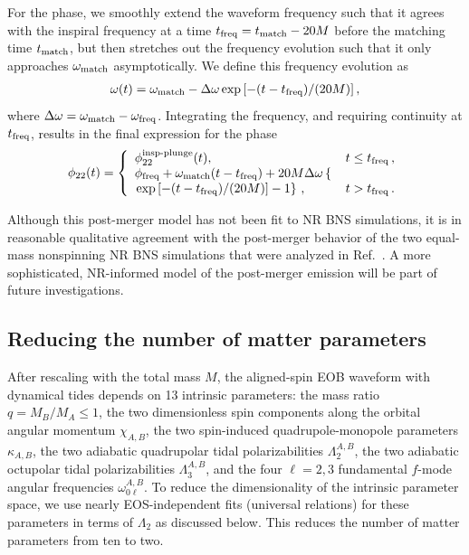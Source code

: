 \documentclass[prd,aps,letter,twocolumn,floatfix,notitlepage,nofootinbib]{revtex4-1}
\begin{document}
For the phase, we smoothly extend the waveform frequency such that it agrees with the inspiral frequency at a time $t_{\rm freq} = t_{\rm match} - 20M$ before the matching time $t_{\rm match}$, but then stretches out the frequency evolution such that it only approaches $\omega_{\rm match}$ asymptotically. We define this frequency evolution as
\begin{align}
\omega(t) = \omega_{\rm match} - \Delta\omega \exp\left[ -(t - t_{\rm freq}) / (20M) \right],
\end{align}
where $\Delta\omega = \omega_{\rm match} - \omega_{\rm freq}$. Integrating the frequency, and requiring continuity at $t_{\rm freq}$, results in the final expression for the phase
\begin{align}
\phi_{22}(t) = \left\{\begin{array}{ll}
\phi_{22}^{\textrm{insp-plunge}}(t), & t \leq t_{\rm freq} \,, \\
\phi_{\rm freq} + \omega_{\rm match}(t - t_{\rm freq}) + 20M \Delta\omega \left\{ \right. & \\
  \left. \exp\left[ -(t - t_{\rm freq}) / (20M) \right] - 1\right\} \,,& t > t_{\rm freq} \, .
\end{array}\right.
\end{align}

Although this post-merger model has not been fit to NR BNS simulations, it is in reasonable qualitative agreement with the post-merger behavior of the two equal-mass nonspinning NR BNS simulations that were analyzed in Ref.~\cite{Hinderer:2016eia}. A more sophisticated, NR-informed model of the post-merger emission will be part of future investigations.


\subsection{Reducing the number of matter parameters}

After rescaling with the total mass $M$, the aligned-spin EOB waveform with dynamical tides depends on 13 intrinsic parameters: the mass ratio $q=M_B/M_A\leq1$, the two dimensionless spin components along the orbital angular momentum $\chi_{A,B}$, the two spin-induced quadrupole-monopole parameters $\kappa_{A,B}$, the two adiabatic quadrupolar tidal polarizabilities $\Lambda_2^{A,B}$, the two adiabatic octupolar tidal polarizabilities $\Lambda_3^{A,B}$, and the four $\ell=2,3$ fundamental $f$-mode angular frequencies $\omega_{0\ell}^{A,B}$. To reduce the dimensionality of the intrinsic parameter space, we use nearly EOS-independent fits (universal relations) for these parameters in terms of $\Lambda_2$ as discussed below. This reduces the number of matter parameters from ten to two.
\end{document}
